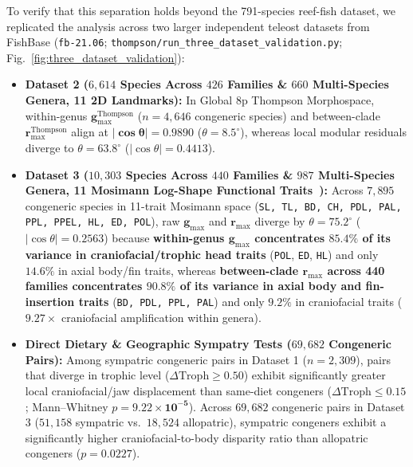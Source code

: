 \documentclass[11pt,a4paper]{article}
\theoremstyle{definition}
\theoremstyle{remark}
\begin{document}
To verify that this separation holds beyond the 791-species reef-fish dataset, we replicated the analysis across two larger independent teleost datasets from FishBase (\texttt{fb-21.06}; \texttt{thompson/run\_three\_dataset\_validation.py}; Fig.~\ref{fig:three_dataset_validation}):
\begin{itemize}
  \item \textbf{Dataset 2 ($6{,}614$ Species Across $426$ Families \& $660$ Multi-Species Genera, 11 2D Landmarks):} In Global 8p Thompson Morphospace, within-genus $\mathbf{g}_{\max}^{\mathrm{Thompson}}$ ($n = 4{,}646$ congeneric species) and between-clade $\mathbf{r}_{\max}^{\mathrm{Thompson}}$ align at $\mathbf{|\cos\theta| = 0.9890}$ ($\theta = \mathbf{8.5^\circ}$), whereas local modular residuals diverge to $\theta = 63.8^\circ$ ($|\cos\theta| = 0.4413$).
  \item \textbf{Dataset 3 ($10{,}303$ Species Across $440$ Families \& $987$ Multi-Species Genera, 11 Mosimann Log-Shape Functional Traits~\cite{Price2019FishShapes}):} Across $7{,}895$ congeneric species in 11-trait Mosimann space (\texttt{SL, TL, BD, CH, PDL, PAL, PPL, PPEL, HL, ED, POL}), raw $\mathbf{g}_{\max}$ and $\mathbf{r}_{\max}$ diverge by $\theta = 75.2^\circ$ ($|\cos\theta| = 0.2563$) because \textbf{within-genus $\mathbf{g}_{\max}$ concentrates $\mathbf{85.4\%}$ of its variance in craniofacial/trophic head traits} (\texttt{POL}, \texttt{ED}, \texttt{HL}) and only $14.6\%$ in axial body/fin traits, whereas \textbf{between-clade $\mathbf{r}_{\max}$ across 440 families concentrates $\mathbf{90.8\%}$ of its variance in axial body and fin-insertion traits} (\texttt{BD, PDL, PPL, PAL}) and only $9.2\%$ in craniofacial traits ($\mathbf{9.27\times}$ craniofacial amplification within genera).
  \item \textbf{Direct Dietary \& Geographic Sympatry Tests ($69{,}682$ Congeneric Pairs):} Among sympatric congeneric pairs in Dataset 1 ($n = 2{,}309$), pairs that diverge in trophic level ($\Delta\mathrm{Troph} \ge 0.50$) exhibit significantly greater local craniofacial/jaw displacement than same-diet congeners ($\Delta\mathrm{Troph} \le 0.15$; Mann--Whitney $p = \mathbf{9.22 \times 10^{-5}}$). Across $69{,}682$ congeneric pairs in Dataset 3 ($51{,}158$ sympatric vs.\ $18{,}524$ allopatric), sympatric congeners exhibit a significantly higher craniofacial-to-body disparity ratio than allopatric congeners ($p = \mathbf{0.0227}$).
\end{itemize}
\end{document}
